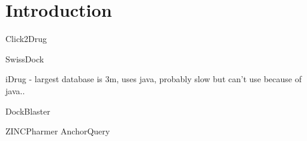 \section{Introduction}

Click2Drug \cite{Villoutreix_2013}

SwissDock \cite{Grosdidier_2011}

iDrug \cite{Wang_2014} - largest database is 3m, uses java, probably slow but can't use because of java..

DockBlaster \cite{Irwin_2009}

ZINCPharmer  \cite{Koes_2012}
AnchorQuery \cite{Koes_2012}